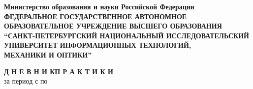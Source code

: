 \documentclass[pta]{../../../scs-iam}
\begin{document}

\thispagestyle{empty}

\begin{center}
  {
    \bfseries
    {
      \subnormal
      Министерство образования и науки Российской Федерации
    } \\[-0.5em]
    {
      \scriptsize
      ФЕДЕРАЛЬНОЕ ГОСУДАРСТВЕННОЕ АВТОНОМНОЕ ОБРАЗОВАТЕЛЬНОЕ УЧРЕЖДЕНИЕ ВЫСШЕГО ОБРАЗОВАНИЯ
    } \\[-0.25em]
    {
      \subnormal
      “САНКТ-ПЕТЕРБУРГСКИЙ НАЦИОНАЛЬНЫЙ ИССЛЕДОВАТЕЛЬСКИЙ \\[-0.5em]
      УНИВЕРСИТЕТ ИНФОРМАЦИОННЫХ ТЕХНОЛОГИЙ, \\[-0.75em]
      МЕХАНИКИ И ОПТИКИ”
    } \\[1em]
  }
\end{center}

\small

\begin{center}
  {
    \normalsize
    \textbf{Д Н Е В Н И К\quad П Р А К Т И К И}
  } \\[-0.25em]
  за период с \underline{} по \underline{}
\end{center}
\end{document}
